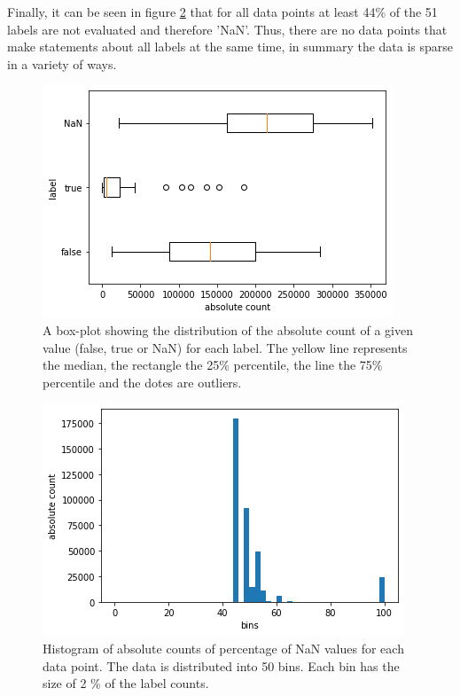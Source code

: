 Finally, it can be seen in figure \ref{abb:histogramm_data} that for all data points at least 44\% of the 51 labels are not evaluated and therefore 'NaN'. Thus, there are no data points that make statements about all labels at the same time, in summary the data is sparse in a variety of ways.

\begin{figure}[H]
	\begin{center}
		\includegraphics[scale=.8]{images/boxplot_label.png}
		\caption{A box-plot showing the distribution of the absolute count of a given value (false, true or NaN) for each label. The yellow line represents the median, the rectangle the 25\% percentile, the line the 75\% percentile and the dotes are outliers.}
		\label{abb:boxplot_label}
	\end{center}		
\end{figure}

\begin{figure}[H]
	\begin{center}
		\includegraphics[scale=.8]{images/hist.png}
		\caption{Histogram of absolute counts of percentage of NaN values for each data point. The data is distributed into 50 bins. Each bin has the size of 2 \% of the label counts.}
		\label{abb:histogramm_data}
	\end{center}		
\end{figure}